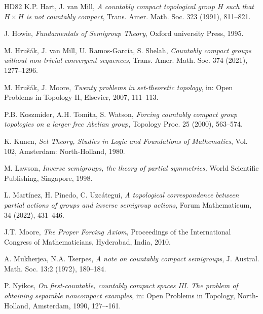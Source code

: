 \documentclass[12pt, twoside, leqno]{article}
\theoremstyle{definition}
\numberwithin{equation}{section}
\begin{document}
\begin{thebibliography}{HD82}
K.P. Hart, J. van Mill, {\em A countably compact topological group $H$ such that
$H {\times} H$ is not countably compact}, Trans. Amer. Math. Soc. 323 (1991), 811--821.

J. Howie, {\em Fundamentals of Semigroup Theory}, Oxford university Press, 1995.

M. Hrušák, J. van Mill, U. Ramos-García, S. Shelah, {\em Countably compact groups without non-trivial convergent sequences}, Trans. Amer. Math. Soc. 374 (2021), 1277--1296.


M. Hru\v{s}\'ak, J. Moore, {\em Twenty problems in set-theoretic topology}, in: 
Open Problems in Topology II, Elsevier, 2007, 111--113.



P.B. Koszmider, A.H. Tomita, S. Watson, {\em Forcing countably compact group
topologies on a larger free Abelian group}, Topology Proc. 25 (2000), 563--574.


K. Kunen, {\em Set Theory, Studies in Logic and Foundations of Mathematics},
Vol. 102, Amsterdam: North-Holland, 1980.


 M. Lawson, {\em Inverse semigroups, the theory of partial symmetries,} World Scientific Publishing, Singapore, 1998.


L. Mart\'inez, H. Pinedo, C. Uzcátegui, {\em A topological correspondence between partial actions of groups and inverse semigroup actions}, Forum Mathematicum, 34 (2022), 431--446.



J.T. Moore, {\em The Proper Forcing Axiom}, Proceedings of  
 the International Congress of Mathematicians, Hyderabad, India, 2010.


A. Mukherjea, N.A. Tserpes, {\em A note on countably compact semigroups}, J. Austral. Math. Soc. 13:2 (1972), 180--184.

P. Nyikos, {\em On first-countable, countably compact spaces III.
The problem of obtaining separable noncompact examples}, in: Open Problems in Topology, North-Holland, Amsterdam, 1990, 127–-161.


\end{thebibliography}
\end{document}
